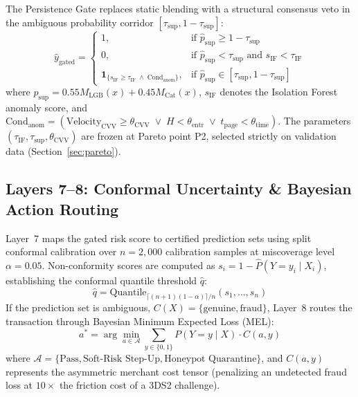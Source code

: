 \documentclass[conference]{IEEEtran}
\begin{document}
The Persistence Gate replaces static blending with a structural consensus veto in the ambiguous probability corridor $[\tau_{\text{sup}}, 1 - \tau_{\text{sup}}]$:
\begin{equation}
    \hat{y}_{\text{gated}} = 
    \begin{cases}
        1, & \text{if } \hat{p}_{\text{sup}} \ge 1 - \tau_{\text{sup}} \\
        0, & \text{if } \hat{p}_{\text{sup}} < \tau_{\text{sup}} \text{ and } s_{\text{IF}} < \tau_{\text{IF}} \\
        \mathbf{1}_{\{s_{\text{IF}} \ge \tau_{\text{IF}} \;\wedge\; \text{Cond}_{\text{anom}}\}}, & \text{if } \hat{p}_{\text{sup}} \in [\tau_{\text{sup}}, 1 - \tau_{\text{sup}}]
    \end{cases}
    \label{eq:gate_equation}
\end{equation}
where $\hat{p}_{\text{sup}} = 0.55 M_{\text{LGB}}(x) + 0.45 M_{\text{Cat}}(x)$, $s_{\text{IF}}$ denotes the Isolation Forest anomaly score, and $\text{Cond}_{\text{anom}} = (\text{Velocity}_{\text{CVV}} \ge \theta_{\text{CVV}} \;\vee\; H < \theta_{\text{entr}} \;\vee\; t_{\text{page}} < \theta_{\text{time}})$. The parameters $(\tau_{\text{IF}}, \tau_{\text{sup}}, \theta_{\text{CVV}})$ are frozen at Pareto point P2, selected strictly on validation data (Section~\ref{sec:pareto}).

\subsection{Layers 7--8: Conformal Uncertainty \& Bayesian Action Routing}
Layer~7 maps the gated risk score to certified prediction sets using split conformal calibration over $n = 2{,}000$ calibration samples at miscoverage level $\alpha = 0.05$. Non-conformity scores are computed as $s_i = 1 - \hat{P}(Y = y_i \mid X_i)$, establishing the conformal quantile threshold $\hat{q}$:
\begin{equation}
    \hat{q} = \text{Quantile}_{\lceil(n+1)(1-\alpha)\rceil / n}(s_1, \dots, s_n)
\end{equation}
If the prediction set is ambiguous, $C(X) = \{\text{genuine}, \text{fraud}\}$, Layer~8 routes the transaction through Bayesian Minimum Expected Loss (MEL):
\begin{equation}
    a^* = \arg\min_{a \in \mathcal{A}} \sum_{y \in \{0, 1\}} P(Y = y \mid X) \cdot C(a, y)
    \label{eq:mel_math}
\end{equation}
where $\mathcal{A} = \{\text{Pass}, \text{Soft-Risk Step-Up}, \text{Honeypot Quarantine}\}$, and $C(a, y)$ represents the asymmetric merchant cost tensor (penalizing an undetected fraud loss at $10\times$ the friction cost of a 3DS2 challenge).
\end{document}
